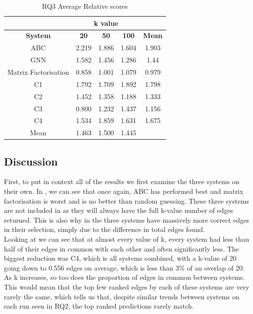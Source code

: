 \documentclass{l4proj}
\begin{document}
\begin{table}[h]
    \centering
    \caption{RQ3 Average Relative scores}
    \label{tab:rq3_score}
    \begin{tabular}{|c|c|c|c|c|}
    \hline
    & \multicolumn{3}{|c|}{k value} & \\ \hline
    \textbf{System} & \textbf{20} & \textbf{50} & \textbf{100} & \textbf{Mean}\\ \hline
    ABC & 2.219 & 1.886 & 1.604 & 1.903\\ \hline
    GNN & 1.582 & 1.456 & 1.286 & 1.44\\ \hline
    Matrix Factorisation & 0.858 & 1.001 & 1.079 & 0.979\\ \hline
    C1 & 1.792 & 1.709 & 1.892 & 1.798\\ \hline
    C2 & 1.452 & 1.358 & 1.188 & 1.333\\ \hline
    C3 & 0.800 & 1.232 & 1.437 & 1.156\\ \hline
    C4 & 1.534 & 1.859 & 1.631 & 1.675\\ \hline
    Mean & 1.463 & 1.500 & 1.445 & \\ \hline
    \end{tabular}
\end{table}

\subsection{Discussion}

First, to put in context all of the results we first examine the three systems on their own. In , we can see that once again, ABC has performed best and matrix factorisation is worst and is no better than random guessing. These three systems are not included in  as they will always have the full k-value number of edges returned. This is also why in  the three systems have massively more correct edges in their selection, simply due to the difference in total edges found. \\

Looking at  we can see that at almost every value of k, every system had less than half of their edges in common with each other and often significantly less. The biggest reduction was C4, which is all systems combined, with a k-value of 20 going down to 0.556 edges on average, which is less than 3\% of an overlap of 20. As k increases, so too does the proportion of edges in common between systems. This would mean that the top few ranked edges by each of these systems are very rarely the same, which tells us that, despite similar trends between systems on each run seen in RQ2, the top ranked predictions rarely match. \\
\end{document}
